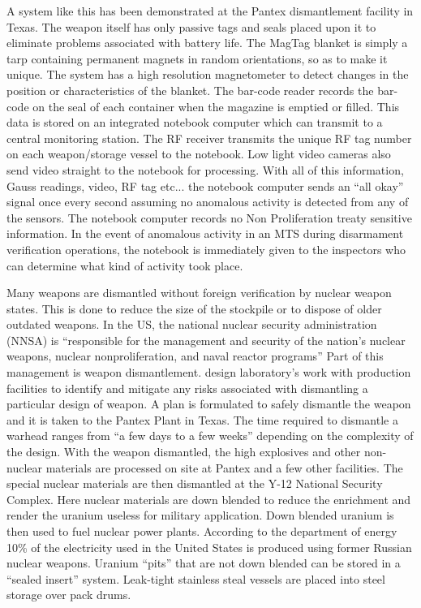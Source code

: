 \documentclass[twoside,titlepage,11pt,twocolumn,a4paper]{article}
\begin{document}
A system like this has been demonstrated at the Pantex dismantlement
facility in Texas. The weapon itself has only passive tags and seals
placed upon it to eliminate problems associated with battery life. The
MagTag blanket is simply a tarp containing permanent magnets in random
orientations, so as to make it unique. The system has a high
resolution magnetometer to detect changes in the position or
characteristics of the blanket. The bar-code reader records the
bar-code on the seal of each container when the magazine is emptied or
filled. This data is stored on an integrated notebook computer which
can transmit to a central monitoring station. The RF receiver
transmits the unique RF tag number on each weapon/storage vessel to
the notebook. Low light video cameras also send video straight to the
notebook for processing. With all of this information, Gauss readings,
video, RF tag etc... the notebook computer sends an ``all okay'' signal
once every second assuming no anomalous activity is detected from any
of the sensors. The notebook computer records no Non Proliferation
treaty sensitive information.  In the event of anomalous activity in
an MTS during disarmament verification operations, the notebook is
immediately given to the inspectors who can determine what kind of
activity took place. \citep{gerdes2001}

Many weapons are dismantled without foreign verification by nuclear
weapon states.  This is done to reduce the size of the stockpile or to
dispose of older outdated weapons.  In the US, the national nuclear
security administration (NNSA) is ``responsible for the management and
security of the nation's nuclear weapons, nuclear nonproliferation,
and naval reactor programs'' \citep{gerdes2001} Part of this management is weapon
dismantlement. design laboratory's work with production facilities to
identify and mitigate any risks associated with dismantling a
particular design of weapon. A plan is formulated to safely dismantle
the weapon and it is taken to the Pantex Plant in Texas. The time
required to dismantle a warhead ranges from ``a few days to a few
weeks'' depending on the complexity of the design.\citep{ourMissionNNSA} With the weapon
dismantled, the high explosives and other non-nuclear materials are
processed on site at Pantex and a few other facilities.  The special
nuclear materials are then dismantled at the Y-12 National Security
Complex.  \citep{pantex2010} Here nuclear materials are down blended to reduce the
enrichment and render the uranium useless for military
application. Down blended uranium is then used to fuel nuclear power
plants. According to the department of energy 10\% of the electricity
used in the United States is produced using former Russian nuclear
weapons.\citep{dismantlementNNSA} Uranium ``pits'' that are not down blended can be stored
in a ``sealed insert'' system. Leak-tight stainless steal vessels are
placed into steel storage over pack drums.
\end{document}
